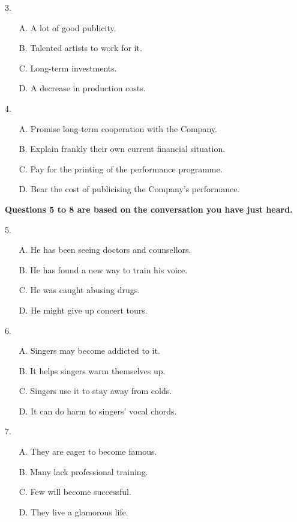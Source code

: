 \documentclass[UTF8,11pt]{ctexart}
\begin{document}
3.


\begin{itemize}[leftmargin=2em,itemsep=.2em,topsep=.4em]\item[A.] A lot of good publicity.
\item[B.] Talented artists to work for it.
\item[C.] Long-term investments.
\item[D.] A decrease in production costs.
\end{itemize}

4.


\begin{itemize}[leftmargin=2em,itemsep=.2em,topsep=.4em]\item[A.] Promise long-term cooperation with the Company.
\item[B.] Explain frankly their own current financial situation.
\item[C.] Pay for the printing of the performance programme.
\item[D.] Bear the cost of publicising the Company's performance.
\end{itemize}

\textbf{Questions 5 to 8 are based on the conversation you have just heard.}


5.


\begin{itemize}[leftmargin=2em,itemsep=.2em,topsep=.4em]\item[A.] He has been seeing doctors and counsellors.
\item[B.] He has found a new way to train his voice.
\item[C.] He was caught abusing drugs.
\item[D.] He might give up concert tours.
\end{itemize}

6.


\begin{itemize}[leftmargin=2em,itemsep=.2em,topsep=.4em]\item[A.] Singers may become addicted to it.
\item[B.] It helps singers warm themselves up.
\item[C.] Singers use it to stay away from colds.
\item[D.] It can do harm to singers' vocal chords.
\end{itemize}

7.


\begin{itemize}[leftmargin=2em,itemsep=.2em,topsep=.4em]\item[A.] They are eager to become famous.
\item[B.] Many lack professional training.
\item[C.] Few will become successful.
\item[D.] They live a glamorous life.
\end{itemize}
\end{document}
